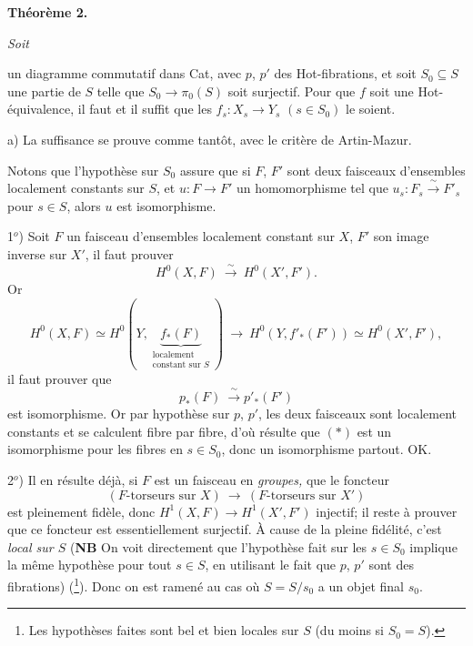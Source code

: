 \textbf{Théorème 2.} {\itshape Soit
un diagramme commutatif dans \textup{Cat}, avec $p$, $p'$ des \textup{Hot}-fibrations, et soit $S_0 \subseteq S$ une partie de $S$ telle que $S_0 \longrightarrow \pi_0(S)$ soit surjectif. Pour que $f$ soit une \textup{Hot}-équivalence, il faut et il suffit que les $f_s : X_s \longrightarrow Y_s$ $(s \in S_0)$ le soient.} %

a) La suffisance se prouve comme tantôt, avec le critère de Artin-Mazur.


Notons que l'hypothèse sur $S_0$ assure que si $F$, $F'$ sont deux faisceaux d'ensembles localement constants sur $S$, et $u : F \longrightarrow F'$ un homomorphisme tel que $u_s : F_s \xrightarrow{\ \sim\ } F'_s$ pour $s \in S$, alors $u$ est isomorphisme. %

1$^{o}$) Soit $F$ un faisceau d'ensembles localement constant sur $X$, $F'$ son image inverse sur $X'$, il faut prouver
\[
H^0(X,F) \ \xrightarrow{\ \sim\ }\ H^0(X',F').
\]
Or
\[
H^0(X,F) \simeq H^0(Y, \underbrace{f_*(F)}_{\substack{\text{localement}\\ \text{constant sur } S}}) \ \longrightarrow\ H^0(Y, f'_*(F')) \simeq H^0(X',F'),
\] %
il faut prouver que
\[
p_*(F) \ \xrightarrow{\ \sim\ } p'_*(F') \tag*{$(*)$}
\]
est isomorphisme. Or par hypothèse sur $p$, $p'$, les deux faisceaux sont localement constants et se calculent fibre par fibre, d'où résulte que $(*)$ est un isomorphisme pour les fibres en $s \in S_0$, donc un isomorphisme partout. OK.

2$^{o}$) Il en résulte déjà, si $F$ est un faisceau en \textit{groupes,} que le foncteur
\[
(F\text{-torseurs sur } X) \ \longrightarrow\ (F\text{-torseurs sur } X')
\]
est pleinement fidèle, donc $H^1(X,F) \longrightarrow H^1(X',F')$ injectif; il reste à prouver que ce foncteur est essentiellement surjectif. À cause de la pleine fidélité, c'est \textit{local sur $S$} (\textbf{NB} On voit directement que l'hypothèse fait sur les $s \in S_0$ implique la même hypothèse pour tout $s \in S$, en utilisant le fait que $p$, $p'$ sont des fibrations) (\footnote{Les hypothèses faites sont bel et bien locales sur $S$ (du moins si $S_0 = S$).}). Donc on est ramené au cas où $S = S/s_0$ a un objet final $s_0$.

